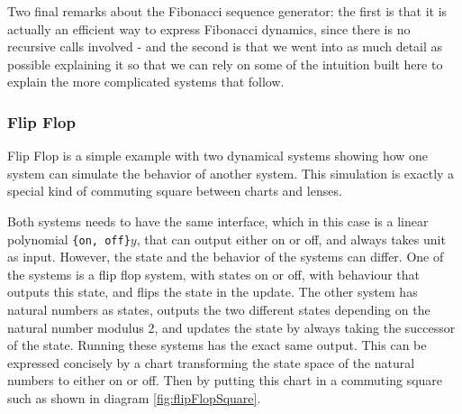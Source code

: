Two final remarks about the Fibonacci sequence generator: the first is that it is actually an efficient way to express Fibonacci dynamics, since there is no recursive calls involved - and the second is that we went into as much detail as possible explaining it so that we can rely on some of the intuition built here to explain the more complicated systems that follow.

\subsubsection{Flip Flop}\label{section:flipflop}
Flip Flop is a simple example with two dynamical systems showing how one system can simulate the behavior of another system. This simulation is exactly a special kind of commuting square between charts and lenses. 

Both systems needs to have the same interface, which in this case is a linear polynomial \texttt{\{on, off\}}$y$, that can output either on or off, and always takes unit as input. However, the state and the behavior of the systems can differ. One of the systems is a flip flop system, with states on or off, with behaviour that outputs this state, and flips the state in the update. The other system has natural numbers as states, outputs the two different states depending on the natural number modulus 2, and updates the state by always taking the successor of the state. Running these systems has the exact same output. This can be expressed concisely by a chart transforming the state space of the natural numbers to either on or off. Then by putting this chart in a commuting square such as shown in diagram \ref{fig:flipFlopSquare}.

